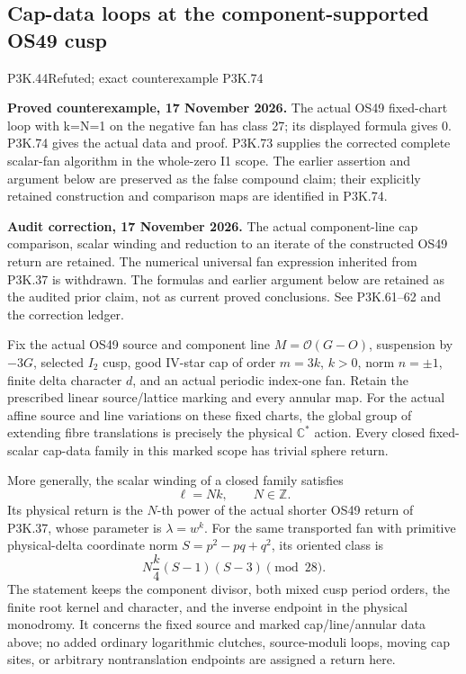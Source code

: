 \subsection{Cap-data loops at the component-supported OS49 cusp}
\begin{statement}{P3K.44}{Refuted; exact counterexample P3K.74}
\par\noindent\textbf{Proved counterexample, 17 November 2026.} The actual OS49 fixed-chart loop with k=N=1 on the negative fan has class 27; its displayed formula gives 0. P3K.74 gives the actual data and proof. P3K.73 supplies the corrected complete scalar-fan algorithm in the whole-zero I1 scope. The earlier assertion and argument below are preserved as the false compound claim; their explicitly retained construction and comparison maps are identified in P3K.74.

\par\noindent\textbf{Audit correction, 17 November 2026.} The actual component-line cap comparison, scalar winding and reduction to an iterate of the constructed OS49 return are retained. The numerical universal fan expression inherited from P3K.37 is withdrawn. The formulas and earlier argument below are retained as the audited prior claim, not as current proved conclusions. See P3K.61--62 and the correction ledger.
\medskip


Fix the actual OS49 source and component line
\(M=\mathcal O(G-O)\), suspension by \(-3G\), selected
\(I_2\) cusp, good IV-star cap of order \(m=3k\), \(k>0\),
norm \(n=\pm1\), finite delta character \(d\), and an actual
periodic index-one fan. Retain the prescribed linear source/lattice
marking and every annular map. For the actual affine source and line
variations on these fixed charts, the global group of extending fibre
translations is precisely the physical \(\mathbb C^*\) action.
Every closed fixed-scalar cap-data family in this marked scope has
trivial sphere return.

More generally, the scalar winding of a closed family satisfies
\[
                          \ell=Nk,\qquad N\in\mathbb Z.
\]
Its physical return is the \(N\)-th power of the actual shorter
OS49 return of P3K.37, whose parameter is \(\lambda=w^k\).
For the same transported fan with primitive physical-delta coordinate
norm \(S=p^2-pq+q^2\), its oriented class is
\[
                       N\frac{k}{4}(S-1)(S-3)\pmod{28}.
\]
The statement keeps the component divisor, both mixed cusp period
orders, the finite root kernel and character, and the inverse endpoint
in the physical monodromy. It concerns the fixed source and marked
cap/line/annular data above; no added ordinary logarithmic clutches,
source-moduli loops, moving cap sites, or arbitrary nontranslation
endpoints are assigned a return here.

\end{statement}
